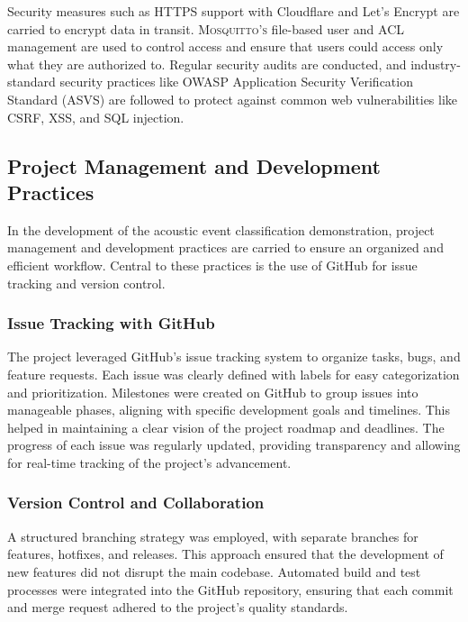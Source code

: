 Security measures such as HTTPS support with Cloudflare and Let's Encrypt are carried to encrypt data in transit. \textsc{Mosquitto’s} file-based user and ACL management are used to control access and ensure that users could access only what they are authorized to. Regular security audits are conducted, and industry-standard security practices like OWASP Application Security Verification Standard (ASVS) are followed to protect against common web vulnerabilities like CSRF, XSS, and SQL injection.

\subsection{Project Management and Development Practices}
In the development of the acoustic event classification demonstration, project management and development practices are carried to ensure an organized and efficient workflow. Central to these practices is the use of GitHub for issue tracking and version control.

\subsubsection{Issue Tracking with GitHub}
The project leveraged GitHub's issue tracking system to organize tasks, bugs, and feature requests. Each issue was clearly defined with labels for easy categorization and prioritization. Milestones were created on GitHub to group issues into manageable phases, aligning with specific development goals and timelines. This helped in maintaining a clear vision of the project roadmap and deadlines. The progress of each issue was regularly updated, providing transparency and allowing for real-time tracking of the project's advancement.

\subsubsection{Version Control and Collaboration}
A structured branching strategy was employed, with separate branches for features, hotfixes, and releases. This approach ensured that the development of new features did not disrupt the main codebase. Automated build and test processes were integrated into the GitHub repository, ensuring that each commit and merge request adhered to the project's quality standards.